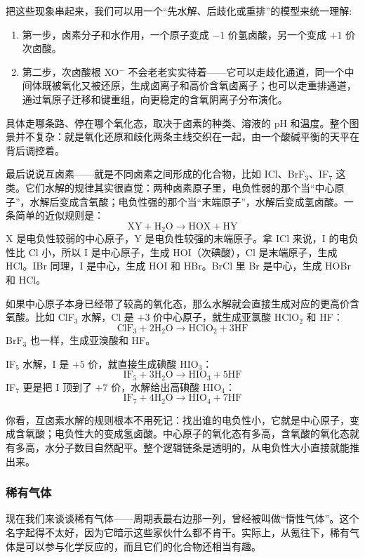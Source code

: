 \documentclass[UTF8]{ctexbook}
\begin{document}
\medskip

把这些现象串起来，我们可以用一个“先水解、后歧化或重排”的模型来统一理解:
\begin{enumerate}
    \item 第一步，卤素分子和水作用，一个原子变成 $-1$ 价氢卤酸，另一个变成 $+1$ 价次卤酸。
    \item 第二步，次卤酸根 XO$^-$ 不会老老实实待着——它可以走歧化通道，同一个中间体既被氧化又被还原，生成卤离子和高价含氧卤离子；也可以走重排通道，通过氧原子迁移和键重组，向更稳定的含氧阴离子分布演化。
\end{enumerate}

具体走哪条路、停在哪个氧化态，取决于卤素的种类、溶液的 pH 和温度。整个图景并不复杂：就是氧化还原和歧化两条主线交织在一起，由一个酸碱平衡的天平在背后调控着。

\medskip

最后说说互卤素——就是不同卤素之间形成的化合物，比如 ICl、BrF$_3$、IF$_7$ 这类。它们水解的规律其实很直觉：两种卤素原子里，电负性弱的那个当“中心原子”，水解后变成含氧酸；电负性强的那个当“末端原子”，水解后变成氢卤酸。一条简单的近似规则是：
\[
\mathrm{XY + H_2O \rightarrow HOX + HY}
\]
X 是电负性较弱的中心原子，Y 是电负性较强的末端原子。拿 ICl 来说，I 的电负性比 Cl 小，所以 I 是中心原子，生成 HOI（次碘酸），Cl 是末端原子，生成 HCl。IBr 同理，I 是中心，生成 HOI 和 HBr。BrCl 里 Br 是中心，生成 HOBr 和 HCl。

如果中心原子本身已经带了较高的氧化态，那么水解就会直接生成对应的更高价含氧酸。比如 ClF$_3$ 水解，Cl 是 $+3$ 价中心原子，就生成亚氯酸 HClO$_2$ 和 HF：
\[
\mathrm{ClF_3 + 2H_2O \rightarrow HClO_2 + 3HF}
\]
BrF$_3$ 也一样，生成亚溴酸和 HF。

IF$_5$ 水解，I 是 $+5$ 价，就直接生成碘酸 HIO$_3$：
\[
\mathrm{IF_5 + 3H_2O \rightarrow HIO_3 + 5HF}
\]
IF$_7$ 更是把 I 顶到了 $+7$ 价，水解给出高碘酸 HIO$_4$：
\[
\mathrm{IF_7 + 4H_2O \rightarrow HIO_4 + 7HF}
\]

你看，互卤素水解的规则根本不用死记：找出谁的电负性小，它就是中心原子，变成含氧酸；电负性大的变成氢卤酸。中心原子的氧化态有多高，含氧酸的氧化态就有多高，水分子数目自然配平。整个逻辑链条是透明的，从电负性大小直接就能推出来。

\newpage
\subsubsection{稀有气体}

现在我们来谈谈稀有气体——周期表最右边那一列，曾经被叫做“惰性气体”。这个名字起得不太好，因为它暗示这些家伙什么都不肯干。实际上，从氪往下，稀有气体是可以参与化学反应的，而且它们的化合物还相当有趣。
\end{document}
